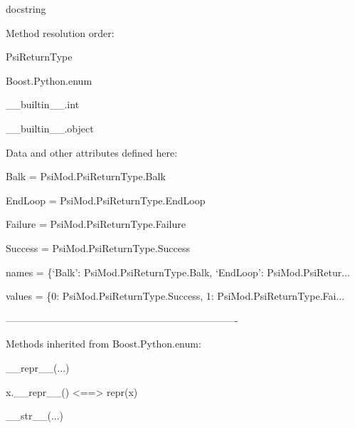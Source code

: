 \documentclass[letterpaper,10pt,english]{sphinxmanual}
\begin{document}
\begin{description}
\begin{description}
\item[{class PsiReturnType(Boost.Python.enum)}] \leavevmode
\begin{DUlineblock}{0em}
\item[] docstring
\item[] 
\item[] Method resolution order:
\item[]
\begin{DUlineblock}{\DUlineblockindent}
\item[] PsiReturnType
\item[] Boost.Python.enum
\item[] \_\_builtin\_\_.int
\item[] \_\_builtin\_\_.object
\item[] 
\end{DUlineblock}
\item[] Data and other attributes defined here:
\item[] 
\item[] Balk = PsiMod.PsiReturnType.Balk
\item[] 
\item[] EndLoop = PsiMod.PsiReturnType.EndLoop
\item[] 
\item[] Failure = PsiMod.PsiReturnType.Failure
\item[] 
\item[] Success = PsiMod.PsiReturnType.Success
\item[] 
\item[] names = \{`Balk': PsiMod.PsiReturnType.Balk, `EndLoop': PsiMod.PsiRetur...
\item[] 
\item[] values = \{0: PsiMod.PsiReturnType.Success, 1: PsiMod.PsiReturnType.Fai...
\item[] 
\item[] ----------------------------------------------------------------------
\item[] Methods inherited from Boost.Python.enum:
\item[] 
\item[] \_\_repr\_\_(...)
\item[]
\begin{DUlineblock}{\DUlineblockindent}
\item[] x.\_\_repr\_\_() \textless{}==\textgreater{} repr(x)
\item[] 
\end{DUlineblock}
\item[] \_\_str\_\_(...)
\item[]

\end{DUlineblock}
\end{description}
\end{description}
\end{document}
